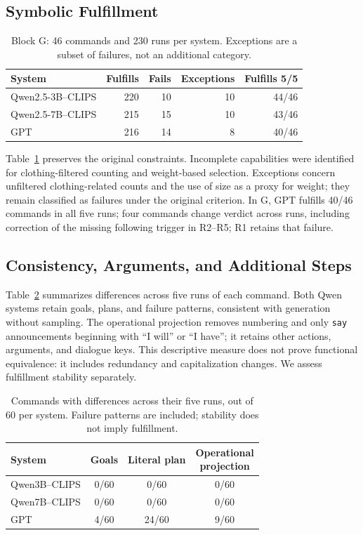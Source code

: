 \documentclass[a4paper,twoside]{article}
\begin{document}
\subsection{Symbolic Fulfillment}

\begin{table}[t]
\centering\small
\caption{Block G: 46 commands and 230 runs per system. Exceptions are a subset of failures, not an additional category.}
\label{tab:resultados_g}
\begin{tabular}{@{}lrrrr@{}}
\toprule
System & Fulfills & Fails & Exceptions & Fulfills 5/5 \\
\midrule
Qwen2.5-3B--CLIPS & 220 & 10 & 10 & 44/46 \\
Qwen2.5-7B--CLIPS & 215 & 15 & 10 & 43/46 \\
GPT & 216 & 14 & 8 & 40/46 \\
\bottomrule
\end{tabular}
\end{table}

Table~\ref{tab:resultados_g} preserves the original constraints. Incomplete capabilities were identified for clothing-filtered counting and weight-based selection. Exceptions concern unfiltered clothing-related counts and the use of size as a proxy for weight; they remain classified as failures under the original criterion. In G, GPT fulfills 40/46 commands in all five runs; four commands change verdict across runs, including correction of the missing following trigger in R2--R5; R1 retains that failure.

\subsection{Consistency, Arguments, and Additional Steps}
Table~\ref{tab:consistencia} summarizes differences across five runs of each command. Both Qwen systems retain goals, plans, and failure patterns, consistent with generation without sampling. The operational projection removes numbering and only \texttt{say} announcements beginning with ``I will'' or ``I have''; it retains other actions, arguments, and dialogue keys. This descriptive measure does not prove functional equivalence: it includes redundancy and capitalization changes. We assess fulfillment stability separately.

\begin{table}[htbp]
\centering\small
\caption{Commands with differences across their five runs, out of 60 per system. Failure patterns are included; stability does not imply fulfillment.}
\label{tab:consistencia}
\begin{tabularx}{\columnwidth}{@{}lccc@{}}
\toprule
System & Goals & Literal plan & \shortstack{Operational\\projection} \\
\midrule
Qwen3B--CLIPS & 0/60 & 0/60 & 0/60 \\
Qwen7B--CLIPS & 0/60 & 0/60 & 0/60 \\
GPT & 4/60 & 24/60 & 9/60 \\
\bottomrule
\end{tabularx}
\end{table}
\end{document}
